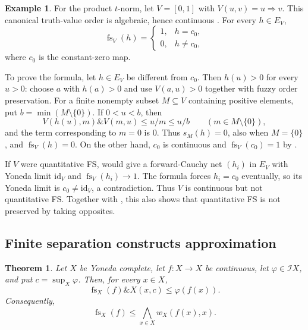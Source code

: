 \documentclass[preprint,3p,times]{elsarticle}
\newtheorem{theorem}{Theorem}[section]
\theoremstyle{definition}
\newtheorem{example}[example]{Example}
\theoremstyle{remark}
\newcommand{\I}{\mathcal{I}}
\newcommand{\id}{\mathrm{id}}
\newcommand{\supop}{\operatorname{sup}}
\newcommand{\fs}{\operatorname{fs}}
\newcommand{\tn}{\mathbin{\&}}
\numberwithin{equation}{section}
\begin{document}
\begin{example}\label{ex:product-order-not-fs}
For the product \(t\)-norm, let \(V=[0,1]\) with \(V(u,v)=u\Rightarrow v\). This canonical truth-value order is algebraic, hence continuous \cite[Example~17.8 and Proposition~17.9]{Zhang2024}. For every \(h\in E_V\),
\[
 \fs_V(h)=
 \begin{cases}
  1,&h=c_0,\\
  0,&h\ne c_0,
 \end{cases}
\]
where \(c_0\) is the constant-zero map.

To prove the formula, let \(h\in E_V\) be different from \(c_0\). Then \(h(u)>0\) for every \(u>0\): choose \(a\) with \(h(a)>0\) and use \(V(a,u)>0\) together with fuzzy order preservation. For a finite nonempty subset \(M\subseteq V\) containing positive elements, put \(b=\min(M\setminus\{0\})\). If \(0<u<b\), then
\[
 V(h(u),m)\tn V(m,u)\leq u/m\leq u/b
 \qquad(m\in M\setminus\{0\}),
\]
and the term corresponding to \(m=0\) is \(0\). Thus \(s_M(h)=0\), also when \(M=\{0\}\), and \(\fs_V(h)=0\). On the other hand, \(c_0\) is continuous and \(\fs_V(c_0)=1\) by .

If \(V\) were quantitative FS,  would give a forward-Cauchy net \((h_i)\) in \(E_V\) with Yoneda limit \(\id_V\) and \(\fs_V(h_i)\to1\). The formula forces \(h_i=c_0\) eventually, so its Yoneda limit is \(c_0\ne\id_V\), a contradiction. Thus \(V\) is continuous but not quantitative FS. Together with , this also shows that quantitative FS is not preserved by taking opposites.
\end{example}

\subsection{Finite separation constructs approximation}\label{sec:approximation}
\begin{theorem}\label{thm:finite-separation-estimate}
Let \(X\) be Yoneda complete, let \(f\colon X\to X\) be continuous, let \(\varphi\in\I X\), and put \(c=\supop_X\varphi\). Then, for every \(x\in X\),
\begin{equation}\label{eq:finite-separation-estimate}
 \fs_X(f)\tn X(x,c)\leq\varphi(f(x)).
\end{equation}
Consequently,
\begin{equation}\label{eq:finite-separation-way-below}
 \fs_X(f)\leq\bigwedge_{x\in X}w_X(f(x),x).
\end{equation}
\end{theorem}
\end{document}
